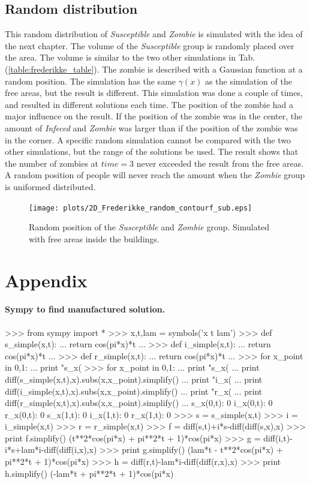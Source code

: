 \documentclass[%
twoside,                 %
final,                   %
10pt]{article}
\begin{document}
\subsection{Random distribution}
This random distribution of \emph{Susceptible} and \emph{Zombie} is simulated with the idea of the next chapter. The volume of the \emph{Susceptible} group is randomly placed over the area. The volume is similar to the two other simulations in Tab.(\ref{table:frederikke_table}). The zombie is described with a Gaussian function at a random position. The simulation has the same $\gamma(x)$ as the simulation of the free areas, but the result is different. This simulation was done a couple of times, and resulted in different solutions each time. The position of the zombie had a major influence on the result. If the position of the zombie was in the center, the amount of \emph{Infeced} and \emph{Zombie} was larger than if the position of the zombie was in the corner. A specific random simulation cannot be compared with the two other simulations, but the range of the solutions be used. The result shows that the number of zombies at $time=3$ never exceeded the result from the free areas. A random position of people will never reach the amount when the \emph{Zombie} group is uniformed distributed.


\begin{figure}[ht]
  \centerline{\texttt{[image: plots/2D\_Frederikke\_random\_contourf\_sub.eps]}}
  \caption{
  \label{fig:frederikke_random} Random position of the \emph{Susceptible} and \emph{Zombie} group. Simulated with free areas inside the buildings.
  }
\end{figure}


\section{Appendix}
\paragraph{Sympy to find manufactured solution.}
\bpycod
>>> from sympy import *
>>> x,t,lam = symbols('x t lam')
>>> def s_simple(x,t):
...     return cos(pi*x)*t
... 
>>> def i_simple(x,t):
...     return cos(pi*x)*t
... 
>>> def r_simple(x,t):
...     return cos(pi*x)*t
... 
>>> for x_point in 0,1:
...     print "s_x(%
>>> for x_point in 0,1:
...     print "s_x(%
...     print diff(s_simple(x,t),x).subs(x,x_point).simplify()
...     print "i_x(%
...     print diff(i_simple(x,t),x).subs(x,x_point).simplify()
...     print "r_x(%
...     print diff(r_simple(x,t),x).subs(x,x_point).simplify()
... 
s_x(0,t):  0
i_x(0,t):  0
r_x(0,t):  0
s_x(1,t):  0
i_x(1,t):  0
r_x(1,t):  0
>>> s = s_simple(x,t)
>>> i = i_simple(x,t)
>>> r = r_simple(x,t)
>>> f = diff(s,t)+i*s-diff(diff(s,x),x)
>>> print f.simplify()
(t**2*cos(pi*x) + pi**2*t + 1)*cos(pi*x)
>>> g = diff(i,t)-i*s+lam*i-diff(diff(i,x),x)
>>> print g.simplify()
(lam*t - t**2*cos(pi*x) + pi**2*t + 1)*cos(pi*x)
>>> h = diff(r,t)-lam*i-diff(diff(r,x),x)
>>> print h.simplify()
(-lam*t + pi**2*t + 1)*cos(pi*x)
\epycod
\end{document}
